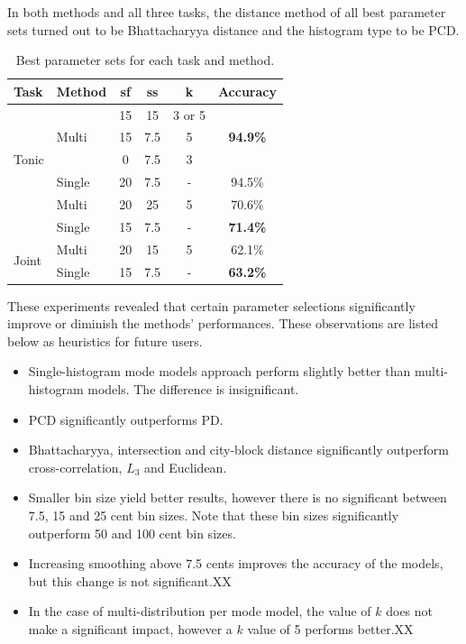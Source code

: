 \documentclass{sig-alternate}
\begin{document}
In both methods and all three tasks, the distance method of all best parameter sets turned out to be Bhattacharyya distance and the histogram type to be PCD.

\begin{table}
\label{tab:best_results}
\caption{Best parameter sets for each task and method.}
 \begin{center}
\begin{tabular}{ l l c c c c }
\hline
\textbf{Task} & \textbf{Method} & \textbf{sf} & \textbf{ss} & \textbf{k} & \textbf{Accuracy}\\ \hline
\multirow{5}{*}{Tonic} & \multirow{3}{*}{Multi} & 15 & 15 & 3 or 5 &\multirow{3}{*}{\textbf{94.9\%}}\\
 & & 15 & 7.5 & 5 &\\
  & & 0 & 7.5 & 3 &\\
 \cline{2-6}
 & Single & 20 & 7.5 & - & 94.5\% \\ \hline
\multirow{2}{*}{Mode} & Multi & 20 & 25 & 5 & 70.6\% \\
\cline{2-6}
& Single & 15 & 7.5 & - & \textbf{71.4\%}\\ \hline
\multirow{2}{*}{Joint} & Multi & 20 & 15 & 5 & 62.1\%\\
\cline{2-6}
& Single & 15 & 7.5 & - & \textbf{63.2\%}\\ \hline
\end{tabular}
\end{center}
\end{table}
These experiments revealed that certain parameter selections significantly improve or diminish the methods' performances. These observations are listed below as heuristics for future users.
\begin{itemize}[noitemsep]
\item Single-histogram mode models approach perform slightly better than multi-histogram models. The difference is insignificant.
\item PCD significantly outperforms PD.
\item Bhattacharyya, intersection and city-block distance significantly outperform cross-correlation, $L_3$ and Euclidean.
\item Smaller bin size yield better results, however there is no significant between 7.5, 15 and 25 cent bin sizes. Note that these bin sizes significantly outperform 50 and 100 cent bin sizes.
\item Increasing smoothing above 7.5 cents improves the accuracy of the models, but this change is not significant.XX
\item In the case of multi-distribution per mode model, the value of $k$ does not make a significant impact, however a $k$ value of 5 performs better.XX
\end{itemize}
\end{document}
